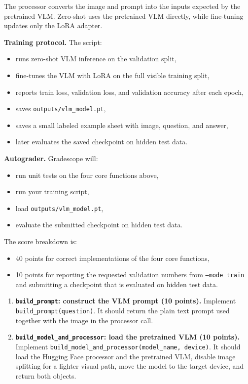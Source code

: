 \begin{Q}
\begin{center}
\small The processor converts the image and prompt into the inputs expected by the pretrained VLM. Zero-shot uses the pretrained VLM directly, while fine-tuning updates only the LoRA adapter.
\end{center}

\medskip
\noindent\textbf{Training protocol.}
The script:
\begin{itemize}
\item runs zero-shot VLM inference on the validation split,
\item fine-tunes the VLM with LoRA on the full visible training split,
\item reports train loss, validation loss, and validation accuracy after each epoch,
\item saves \texttt{outputs/vlm\_model.pt},
\item saves a small labeled example sheet with image, question, and answer,
\item later evaluates the saved checkpoint on hidden test data.
\end{itemize}

\medskip
\noindent\textbf{Autograder.}
Gradescope will:
\begin{itemize}
\item run unit tests on the four core functions above,
\item run your training script,
\item load \texttt{outputs/vlm\_model.pt},
\item evaluate the submitted checkpoint on hidden test data.
\end{itemize}
The score breakdown is:
\begin{itemize}
\item 40 points for correct implementations of the four core functions,
\item 10 points for reporting the requested validation numbers from \texttt{--mode train} and submitting a checkpoint that is evaluated on hidden test data.
\end{itemize}

\begin{enumerate}

\item \textbf{\texttt{build\_prompt}: construct the VLM prompt (10 points).}
Implement \texttt{build\_prompt(question)}.
It should return the plain text prompt used together with the image in the processor call.

\item \textbf{\texttt{build\_model\_and\_processor}: load the pretrained VLM (10 points).}
Implement \texttt{build\_model\_and\_processor(model\_name, device)}.
It should load the Hugging Face processor and the pretrained VLM, disable image splitting for a lighter visual path, move the model to the target device, and return both objects.


\end{enumerate}
\end{Q}
